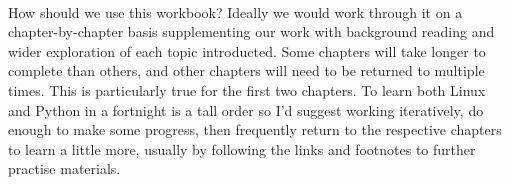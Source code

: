 \documentclass[12pt, a4paper, oneside]{book}
\begin{document}

\paragraph{} How should we use this workbook? Ideally we would work through it on a chapter-by-chapter basis supplementing our work with background reading and wider exploration of each topic introducted. Some chapters will take longer to complete than others, and other chapters will need to be returned to multiple times. This is particularly true for the first two chapters. To learn both Linux and Python in a fortnight is a tall order so I'd suggest working iteratively, do enough to make some progress, then frequently return to the respective chapters to learn a little more, usually by following the links and footnotes to further practise materials.
\end{document}
